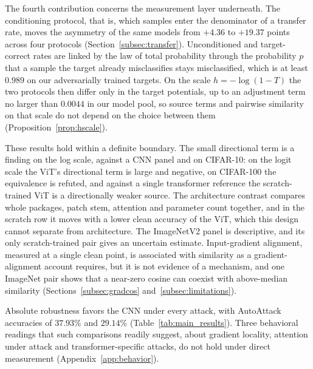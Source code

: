 The fourth contribution concerns the measurement layer underneath. The conditioning protocol, that is, which samples enter the denominator of a transfer rate, moves the asymmetry of the same models from $+4.36$ to $+19.37$ points across four protocols (Section~\ref{subsec:transfer}). Unconditioned and target-correct rates are linked by the law of total probability through the probability $p$ that a sample the target already misclassifies stays misclassified, which is at least $0.989$ on our adversarially trained targets. On the scale $h = -\log(1-T)$ the two protocols then differ only in the target potentials, up to an adjustment term no larger than $0.0044$ in our model pool, so source terms and pairwise similarity on that scale do not depend on the choice between them (Proposition~\ref{prop:hscale}).

These results hold within a definite boundary. The small directional term is a finding on the log scale, against a CNN panel and on CIFAR-10: on the logit scale the ViT's directional term is large and negative, on CIFAR-100 the equivalence is refuted, and against a single transformer reference the scratch-trained ViT is a directionally weaker source. The architecture contrast compares whole packages, patch stem, attention and parameter count together, and in the scratch row it moves with a lower clean accuracy of the ViT, which this design cannot separate from architecture. The ImageNetV2 panel is descriptive, and its only scratch-trained pair gives an uncertain estimate. Input-gradient alignment, measured at a single clean point, is associated with similarity as a gradient-alignment account requires, but it is not evidence of a mechanism, and one ImageNet pair shows that a near-zero cosine can coexist with above-median similarity (Sections~\ref{subsec:gradcos} and~\ref{subsec:limitations}).

Absolute robustness favors the CNN under every attack, with AutoAttack accuracies of $37.93\%$ and $29.14\%$ (Table~\ref{tab:main_results}). Three behavioral readings that such comparisons readily suggest, about gradient locality, attention under attack and transformer-specific attacks, do not hold under direct measurement (Appendix~\ref{app:behavior}).

